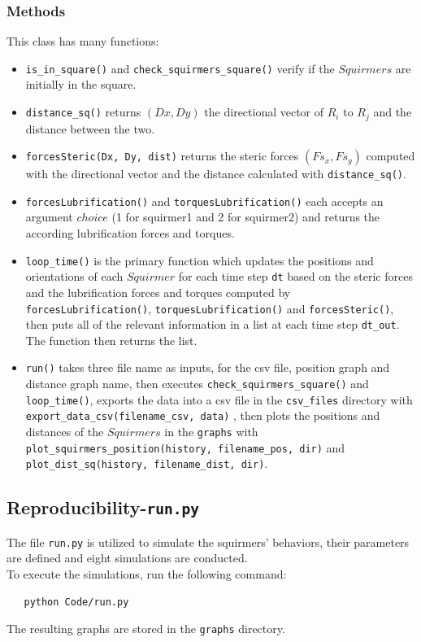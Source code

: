 \documentclass{article}
\begin{document}
\subsubsection*{Methods}
This class has many functions:
\begin{itemize}
   \item \texttt{is\_in\_square()} and \texttt{check\_squirmers\_square()} verify if the $Squirmers$ 
    are initially in the square.
   \item \texttt{distance\_sq()} returns $(Dx, Dy)$ the directional vector of $R_{i}$ to $R_{j}$ 
   and the distance between the two.
   \item \texttt{forcesSteric(Dx, Dy, dist)} returns the steric forces $(Fs_x, Fs_y)$ computed with the directional vector and the distance calculated with \texttt{distance\_sq()}.
   \item \texttt{forcesLubrification()} and \texttt{torquesLubrification()} each accepts an argument $choice$ (1 for squirmer1 and 2 for squirmer2)
   and returns the according lubrification forces and torques.
   \item \texttt{loop\_time()} is the primary function which updates the positions and orientations of each $Squirmer$
   for each time step \texttt{dt} based on the steric forces and the lubrification forces and torques computed by \texttt{forcesLubrification()}, 
   \texttt{torquesLubrification()} and \texttt{forcesSteric()}, then puts all of the relevant information in a list
   at each time step \texttt{dt\_out}. The function then returns the list.
   \item \texttt{run()} takes three file name as inputs, for the csv file, position graph and distance graph name, 
   then executes \texttt{check\_squirmers\_square()} and \texttt{loop\_time()},
   exports the data into a csv file in the \texttt{csv\_files} directory with \texttt{export\_data\_csv(filename\_csv, data)} 
   , then plots the positions and distances of the $Squirmers$ in the \texttt{graphs} with \texttt{plot\_squirmers\_position(history, filename\_pos, dir)}
   and \texttt{plot\_dist\_sq(history, filename\_dist, dir)}.
\end{itemize}

\subsection{Reproducibility-\texttt{run.py}}
The file \texttt{run.py} is utilized to simulate the squirmers' behaviors, their parameters are defined
 and eight simulations are conducted.\\
 To execute the simulations, run the following command:
 \begin{verbatim}
   python Code/run.py
\end{verbatim} 
 The resulting graphs are stored in the 
 \texttt{graphs} directory.
\end{document}
